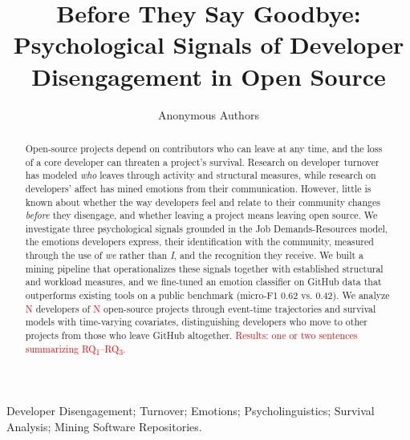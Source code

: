 \documentclass[conference]{IEEEtran}
\newcommand{\tbd}[1]{\textcolor{red}{#1}}
\begin{document}
\title{Before They Say Goodbye: Psychological Signals of Developer Disengagement in Open Source}

\author{Anonymous Authors}

\maketitle

\begin{abstract}
Open-source projects depend on contributors who can leave at any time, and the loss of a core developer can threaten a project's survival. Research on developer turnover has modeled \textit{who} leaves through activity and structural measures, while research on developers' affect has mined emotions from their communication. However, little is known about whether the way developers feel and relate to their community changes \textit{before} they disengage, and whether leaving a project means leaving open source. We investigate three psychological signals grounded in the Job Demands-Resources model, \ie the emotions developers express, their identification with the community, measured through the use of \textit{we} rather than \textit{I}, and the recognition they receive. We built a mining pipeline that operationalizes these signals together with established structural and workload measures, and we fine-tuned an emotion classifier on GitHub data that outperforms existing tools on a public benchmark (micro-F1 0.62 vs. 0.42). We analyze \tbd{N} developers of \tbd{N} open-source projects through event-time trajectories and survival models with time-varying covariates, distinguishing developers who move to other projects from those who leave GitHub altogether. \tbd{Results: one or two sentences summarizing RQ\textsubscript{1}--RQ\textsubscript{3}.}
\end{abstract}

\begin{IEEEkeywords}
Developer Disengagement; Turnover; Emotions; Psycholinguistics; Survival Analysis; Mining Software Repositories.
\end{IEEEkeywords}








\balance


\end{document}
